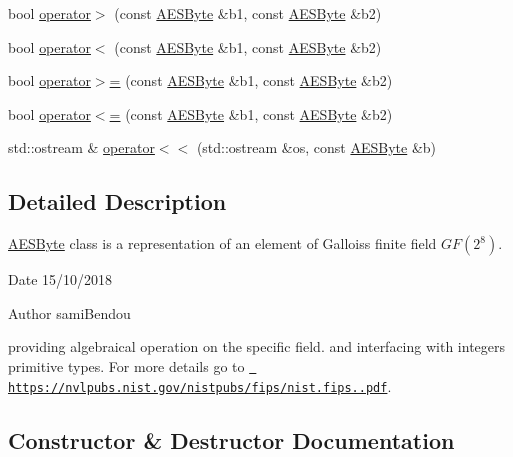 \begin{DoxyCompactItemize}
\item 
bool \mbox{\hyperlink{class_a_e_s_byte_aa58238c585ec99b8af1f95349d013463}{operator$>$}} (const \mbox{\hyperlink{class_a_e_s_byte}{A\+E\+S\+Byte}} \&b1, const \mbox{\hyperlink{class_a_e_s_byte}{A\+E\+S\+Byte}} \&b2)
\item 
bool \mbox{\hyperlink{class_a_e_s_byte_a24de3dafa3bf5c617366f83099a15656}{operator$<$}} (const \mbox{\hyperlink{class_a_e_s_byte}{A\+E\+S\+Byte}} \&b1, const \mbox{\hyperlink{class_a_e_s_byte}{A\+E\+S\+Byte}} \&b2)
\item 
bool \mbox{\hyperlink{class_a_e_s_byte_a676c2c24ecb18ec4ae60623d21ad72c5}{operator$>$=}} (const \mbox{\hyperlink{class_a_e_s_byte}{A\+E\+S\+Byte}} \&b1, const \mbox{\hyperlink{class_a_e_s_byte}{A\+E\+S\+Byte}} \&b2)
\item 
bool \mbox{\hyperlink{class_a_e_s_byte_ae9209fb9b57d49998d15961f356cd351}{operator$<$=}} (const \mbox{\hyperlink{class_a_e_s_byte}{A\+E\+S\+Byte}} \&b1, const \mbox{\hyperlink{class_a_e_s_byte}{A\+E\+S\+Byte}} \&b2)
\item 
std\+::ostream \& \mbox{\hyperlink{class_a_e_s_byte_a6e506ef4c13b155606735a48f7bb3bb9}{operator$<$$<$}} (std\+::ostream \&os, const \mbox{\hyperlink{class_a_e_s_byte}{A\+E\+S\+Byte}} \&b)
\end{DoxyCompactItemize}


\subsection{Detailed Description}
\mbox{\hyperlink{class_a_e_s_byte}{A\+E\+S\+Byte}} class is a representation of an element of Gallois\textquotesingle{}s finite field $ GF(2^8) $. 

\begin{DoxyDate}{Date}
15/10/2018 
\end{DoxyDate}
\begin{DoxyAuthor}{Author}
sami\+Bendou
\end{DoxyAuthor}
providing algebraical operation on the specific field. and interfacing with integers primitive types. For more details go to \href{https://nvlpubs.nist.gov/nistpubs/fips/nist.fips.197.pdf}{\texttt{ https\+://nvlpubs.\+nist.\+gov/nistpubs/fips/nist.\+fips..\+pdf}}. 

\subsection{Constructor \& Destructor Documentation}
\mbox{\label{class_a_e_s_byte_a89baf49deb1db33de03629e3ebf7c455}} 

